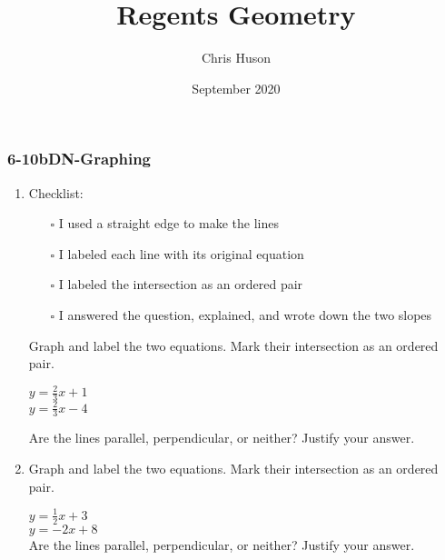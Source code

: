 \documentclass[12pt, twoside]{article}
\title{Regents Geometry}
\author{Chris Huson}
\date{September 2020}
\begin{document}
\subsubsection*{6-10bDN-Graphing}
\begin{enumerate}
\item Checklist:
  \begin{itemize}
    \item[$\square$]   I used a straight edge to make the lines
    \item[$\square$]   I labeled each line with its original equation
    \item[$\square$]   I labeled the intersection as an ordered pair
    \item[$\square$]   I answered the question, explained, and wrote down the two slopes
  \end{itemize}
  Graph and label the two equations. Mark their intersection as an ordered pair.
    \begin{multicols}{2}
      $y =\frac{2}{3}x+1$ \\
      $y=\frac{2}{3}x-4$
    \end{multicols}     \vspace{0.1cm}
    Are the lines parallel, perpendicular, or neither? Justify your answer.
    \vspace{2.5cm}

    \begin{center} %
    \end{center}

\newpage
\item Graph and label the two equations. Mark their intersection as an ordered pair.
      \begin{multicols}{2}
        $y =\frac{1}{2}x+3$ \\[0.25cm]
        $y=-2x+8$ \\
        Are the lines parallel, perpendicular, or neither? Justify your answer.
      \end{multicols}     \vspace{0.1cm}
      \vspace{1cm}


\end{enumerate}
\end{document}
